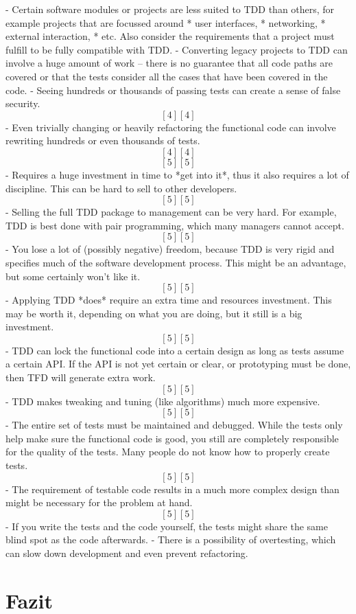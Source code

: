 \documentclass{mitschrift}
\newcommand{\pje}{\marginpar{Philipp\\Jeske}}
\begin{document}
 - Certain software modules or projects are less suited to TDD than others,
   for example projects that are focussed around
    * user interfaces,
    * networking,
    * external interaction,
    * etc.
   Also consider the requirements that a project must fulfill to be fully
   compatible with TDD.
 - Converting legacy projects to TDD can involve a huge amount of work
   – there is no guarantee that all code paths are covered or that the tests
   consider all the cases that have been covered in the code.
 - Seeing hundreds or thousands of passing tests can create a sense of false
   security. \[[4][4]\]
 - Even trivially changing or heavily refactoring the functional code can
   involve rewriting hundreds or even thousands of tests. \[[4][4]\] \[[5][5]\]
 - Requires a huge investment in time to *get into it*, thus it also
   requires a lot of discipline. This can be hard to sell to other
   developers. \[[5][5]\]
 - Selling the full TDD package to management can be very hard. For example,
   TDD is best done with pair programming, which many managers cannot
   accept. \[[5][5]\]
 - You lose a lot of (possibly negative) freedom, because TDD is very rigid
   and specifies much of the software development process. This might be
   an advantage, but some certainly won't like it. \[[5][5]\]
 - Applying TDD *does* require an extra time and resources investment. This
   may be worth it, depending on what you are doing, but it still is a big
   investment. \[[5][5]\]
 - TDD can lock the functional code into a certain design as long as tests
   assume a certain API. If the API is not yet certain or clear, or
   prototyping must be done, then TFD will generate extra work. \[[5][5]\]
 - TDD makes tweaking and tuning (like algorithms) much more expensive.
   \[[5][5]\]
 - The entire set of tests must be maintained and debugged. While the tests
   only help make sure the functional code is good, you still are completely
   responsible for the quality of the tests. Many people do not know how to
   properly create tests. \[[5][5]\]
 - The requirement of testable code results in a much more complex design
   than might be necessary for the problem at hand. \[[5][5]\]
 - If you write the tests and the code yourself, the tests might share the
   same blind spot as the code afterwards.
 - There is a possibility of overtesting, which can slow down development
   and even prevent refactoring.

\chapter{Fazit}
\pje
\end{document}
